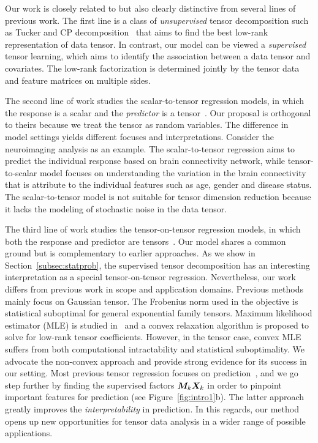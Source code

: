 \documentclass[12pt]{article}
\theoremstyle{plain}
\theoremstyle{definition}
\begin{document}
Our work is closely related to but also clearly distinctive from several lines of previous work. The first line is a class of \textit{unsupervised} tensor decomposition such as Tucker and CP decomposition~\citep{de2000multilinear, kolda2009tensor,zhang2018tensor, hong2020generalized} that aims to find the best low-rank representation of data tensor. In contrast, our model can be viewed a \textit{supervised} tensor learning, which aims to identify the association between a data tensor and covariates. The low-rank factorization is determined jointly by the tensor data and feature matrices on multiple sides.

The second line of work studies the scalar-to-tensor regression models, in which the response is a scalar and the \textit{predictor} is a tensor~\citep{zhou2013tensor,chen2019non}. Our proposal is orthogonal to theirs because we treat the tensor as random variables. The difference in model settings yields different focuses and interpretations. Consider the neuroimaging analysis as an example. The scalar-to-tensor regression aims to predict the individual response based on brain connectivity network, while tensor-to-scalar model focuses on understanding the variation in the brain connectivity that is attribute to the individual features such as age, gender and disease status. The scalar-to-tensor model is not suitable for tensor dimension reduction because it lacks the modeling of stochastic noise in the data tensor. 

The third line of work studies the tensor-on-tensor regression models, in which both the response and predictor are tensors~\citep{raskutti2015convex, lock2018tensor, gahrooei2020multiple}. Our model shares a common ground but is complementary to earlier approaches. As we show in Section~\ref{subsec:statprob}, the supervised tensor decomposition 
has an interesting interpretation as a special tensor-on-tensor regression. Nevertheless, our work differs from previous work in scope and application domains. Previous methods~\citep{gahrooei2020multiple,lock2018tensor} mainly focus on Gaussian tensor. The Frobenius norm used in the objective is statistical suboptimal for general exponential family tensors. Maximum likelihood estimator (MLE) is studied in~\cite{raskutti2015convex} and a convex relaxation algorithm is proposed to solve for low-rank tensor coefficients. However, in the tensor case, convex MLE suffers from both computational intractability and statistical suboptimality. We advocate the non-convex approach and provide strong evidence for its success in our setting. Most previous tensor regression focuses on prediction~\citep{lock2018tensor,raskutti2015convex,gahrooei2020multiple}, and we go step further by finding the supervised factors $\bm M_k\bm X_k$ in order to pinpoint important features for prediction (see Figure~\ref{fig:intro1}b). The latter approach greatly improves the \emph{interpretability} in prediction. In this regards, our method opens up new opportunities for tensor data analysis in a wider range of possible applications. 
\end{document}

